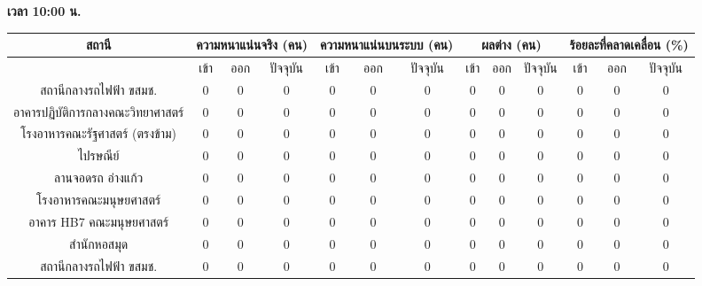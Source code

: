     \textbf{เวลา 10:00 น.}
    {\tiny\begin{center}
        \begin{tabular}{ | c | c | c | c | c | c | c | c | c | c | c | c | c |  }
            \hline
                \multirow{2}{*}{สถานี} & \multicolumn{3}{|c|}{ความหนาแน่นจริง (คน)} & \multicolumn{3}{|c|}{ความหนาแน่นบนระบบ (คน)} & \multicolumn{3}{|c|}{ผลต่าง (คน)} & \multicolumn{3}{|c|}{ร้อยละที่คลาดเคลื่อน (\%)} \\
            \hline
                & เข้า & ออก & ปัจจุบัน & เข้า & ออก & ปัจจุบัน & เข้า & ออก & ปัจจุบัน & เข้า & ออก & ปัจจุบัน \\
            \hline
                สถานีกลางรถไฟฟ้า ขสมช.            & 0 & 0 & 0 & 0 & 0 & 0 & 0 & 0 & 0 & 0 & 0 & 0 \\
                อาคารปฏิบัติการกลางคณะวิทยาศาสตร์    & 0 & 0 & 0 & 0 & 0 & 0 & 0 & 0 & 0 & 0 & 0 & 0 \\
                โรงอาหารคณะรัฐศาสตร์ (ตรงข้าม)      & 0 & 0 & 0 & 0 & 0 & 0 & 0 & 0 & 0 & 0 & 0 & 0 \\
                ไปรษณีย์                          & 0 & 0 & 0 & 0 & 0 & 0 & 0 & 0 & 0 & 0 & 0 & 0 \\
                ลานจอดรถ อ่างแก้ว                  & 0 & 0 & 0 & 0 & 0 & 0 & 0 & 0 & 0 & 0 & 0 & 0 \\
                โรงอาหารคณะมนุษยศาสตร์            & 0 & 0 & 0 & 0 & 0 & 0 & 0 & 0 & 0 & 0 & 0 & 0 \\
                อาคาร HB7 คณะมนุษยศาสตร์          & 0 & 0 & 0 & 0 & 0 & 0 & 0 & 0 & 0 & 0 & 0 & 0 \\
                สำนักหอสมุด                       & 0 & 0 & 0 & 0 & 0 & 0 & 0 & 0 & 0 & 0 & 0 & 0 \\
                สถานีกลางรถไฟฟ้า ขสมช.            & 0 & 0 & 0 & 0 & 0 & 0 & 0 & 0 & 0 & 0 & 0 & 0 \\
            \hline
        \end{tabular}
    \end{center}}

